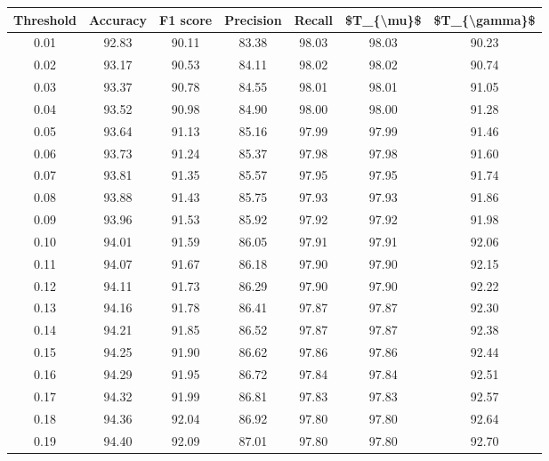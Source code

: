 \begin{tabular}{|c|c|c|c|c|c|c|}
\hline
 Threshold &  Accuracy &  F1 score &  Precision &  Recall &  \$T\_\{\textbackslash mu\}\$ &  \$T\_\{\textbackslash gamma\}\$ \\
\hline
      0.01 &     92.83 &     90.11 &      83.38 &   98.03 &      98.03 &         90.23 \\
      0.02 &     93.17 &     90.53 &      84.11 &   98.02 &      98.02 &         90.74 \\
      0.03 &     93.37 &     90.78 &      84.55 &   98.01 &      98.01 &         91.05 \\
      0.04 &     93.52 &     90.98 &      84.90 &   98.00 &      98.00 &         91.28 \\
      0.05 &     93.64 &     91.13 &      85.16 &   97.99 &      97.99 &         91.46 \\
      0.06 &     93.73 &     91.24 &      85.37 &   97.98 &      97.98 &         91.60 \\
      0.07 &     93.81 &     91.35 &      85.57 &   97.95 &      97.95 &         91.74 \\
      0.08 &     93.88 &     91.43 &      85.75 &   97.93 &      97.93 &         91.86 \\
      0.09 &     93.96 &     91.53 &      85.92 &   97.92 &      97.92 &         91.98 \\
      0.10 &     94.01 &     91.59 &      86.05 &   97.91 &      97.91 &         92.06 \\
      0.11 &     94.07 &     91.67 &      86.18 &   97.90 &      97.90 &         92.15 \\
      0.12 &     94.11 &     91.73 &      86.29 &   97.90 &      97.90 &         92.22 \\
      0.13 &     94.16 &     91.78 &      86.41 &   97.87 &      97.87 &         92.30 \\
      0.14 &     94.21 &     91.85 &      86.52 &   97.87 &      97.87 &         92.38 \\
      0.15 &     94.25 &     91.90 &      86.62 &   97.86 &      97.86 &         92.44 \\
      0.16 &     94.29 &     91.95 &      86.72 &   97.84 &      97.84 &         92.51 \\
      0.17 &     94.32 &     91.99 &      86.81 &   97.83 &      97.83 &         92.57 \\
      0.18 &     94.36 &     92.04 &      86.92 &   97.80 &      97.80 &         92.64 \\
      0.19 &     94.40 &     92.09 &      87.01 &   97.80 &      97.80 &         92.70 \\

\end{tabular}
